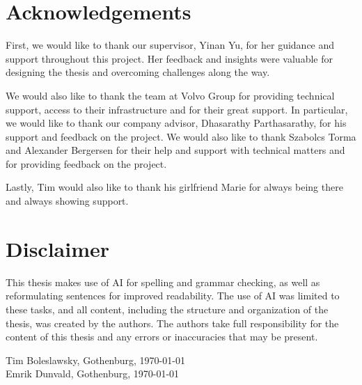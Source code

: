 \thispagestyle{plain}			%
\section*{Acknowledgements}
First, we would like to thank our supervisor, Yinan Yu, for her guidance and support throughout this project. Her feedback and insights were valuable for designing the thesis and overcoming challenges along the way. 

We would also like to thank the team at Volvo Group for providing technical support, access to their infrastructure and for their great support. In particular, we would like to thank our company advisor, Dhasarathy Parthasarathy, for his support and feedback on the project. We would also like to thank Szabolcs Torma and Alexander Bergersen for their help and support with technical matters and for providing feedback on the project.

Lastly, Tim would also like to thank his girlfriend Marie for always being there and always showing support. 

\section*{Disclaimer}
This thesis makes use of AI for spelling and grammar checking, as well as reformulating sentences for improved readability. The use of AI was limited to these tasks, and all content, including the structure and organization of the thesis, was created by the authors. The authors take full responsibility for the content of this thesis and any errors or inaccuracies that may be present.

\vspace{1.5cm}
Tim Boleslawsky, Gothenburg, \today \\
Emrik Dunvald, Gothenburg, \today

\newpage				%
\thispagestyle{empty}
\mbox{}